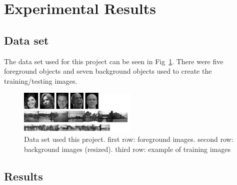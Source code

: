 \documentclass{article} %
\begin{document}
\section{Experimental Results}
\label{result}
\subsection{Data set}
\label{data_set}
The data set used for this project can be seen in Fig~\ref{fig:data_set}. There were five foreground objects and seven background objects used to create the training/testing images. 

\begin{figure}[h]
\begin{center}
\includegraphics[width=0.5\textwidth]{data_set}
\end{center}
\caption{Data set used this project. first row: foreground images. second row: background images (resized). third row: example of training images}
\label{fig:data_set}
\end{figure}

\subsection{Results}
\label{numberial_result}
\end{document}
